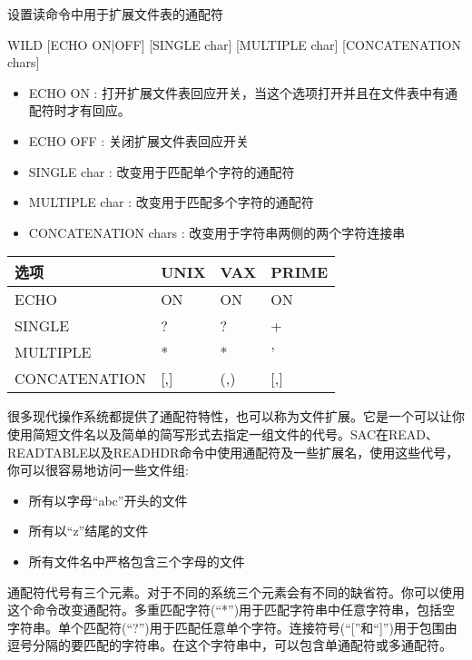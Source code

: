 \label{cmd:wild}

设置读命令中用于扩展文件表的通配符

\begin{SACSTX}
WILD [ECHO ON|OFF] [SINGLE char] [MULTIPLE char] [CONCATENATION chars]
\end{SACSTX}

\begin{itemize}
\item ECHO ON : 打开扩展文件表回应开关，当这个选项打开并且在文件表中有通配符时才有回应。 
\item ECHO OFF : 关闭扩展文件表回应开关 
\item SINGLE char : 改变用于匹配单个字符的通配符 
\item MULTIPLE char : 改变用于匹配多个字符的通配符 
\item CONCATENATION chars : 改变用于字符串两侧的两个字符连接串 
\end{itemize}

\begin{center}
\begin{tabular}{llll}
\toprule
选项	&	UNIX	&	VAX		&	PRIME	\\
\midrule
ECHO	&	ON 		&	ON 		&	ON		\\
SINGLE  &	?  		&	?  		&	+		\\
MULTIPLE&	* 		&	* 		&	'		\\
CONCATENATION& [,] & 	(,)  	&	[,]		\\
\bottomrule
\end{tabular}
\end{center}

很多现代操作系统都提供了通配符特性，也可以称为文件扩展。它是一个可以让你使用简短文件名以及简单的简写形式去指定一组文件的代号。SAC在READ、READTABLE以及READHDR命令中使用通配符及一些扩展名，使用这些代号，你可以很容易地访问一些文件组:
\begin{itemize}
\item 所有以字母``abc''开头的文件
\item 所有以``z''结尾的文件
\item 所有文件名中严格包含三个字母的文件
\end{itemize}

通配符代号有三个元素。对于不同的系统三个元素会有不同的缺省符。你可以使用这个命令改变通配符。多重匹配字符(``*'')用于匹配字符串中任意字符串，包括空字符串。单个匹配符(``?'')用于匹配任意单个字符。连接符号(``[''和``]'')用于包围由逗号分隔的要匹配的字符串。在这个字符串中，可以包含单通配符或多通配符。

